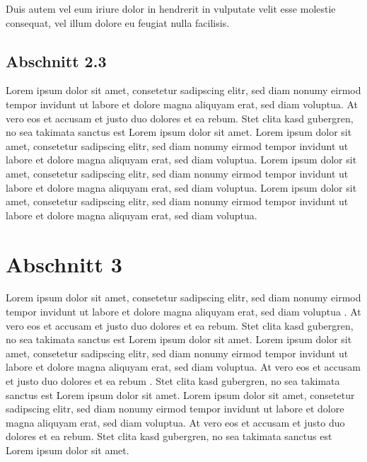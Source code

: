 Duis autem vel eum iriure dolor in hendrerit in vulputate velit esse molestie
consequat, vel illum dolore eu feugiat nulla facilisis.

\subsection{Abschnitt 2.3}
\label{ch:XYZ:sec:Abschnitt2:subsec:Abschnitt2-3}
Lorem ipsum dolor sit amet, consetetur sadipscing elitr, sed diam nonumy eirmod
tempor invidunt ut labore et dolore magna aliquyam erat, sed diam voluptua. At
vero eos et accusam et justo duo dolores et ea rebum. Stet clita
kasd gubergren, no sea takimata sanctus est Lorem ipsum dolor sit amet.
Lorem ipsum dolor sit amet, consetetur sadipscing elitr, sed diam nonumy eirmod
tempor invidunt ut labore et dolore magna aliquyam erat, sed diam voluptua.
Lorem ipsum dolor sit amet, consetetur sadipscing elitr, sed diam nonumy eirmod
tempor invidunt ut labore et dolore magna aliquyam erat, sed diam voluptua.
Lorem ipsum dolor sit amet, consetetur sadipscing elitr, sed diam nonumy eirmod
tempor invidunt ut labore et dolore magna aliquyam erat, sed diam voluptua.

\section{Abschnitt 3}
\label{ch:XYZ:sec:Abschnitt3}

Lorem ipsum dolor sit amet, consetetur sadipscing elitr, sed diam nonumy eirmod
tempor invidunt ut labore et dolore magna aliquyam erat, sed diam voluptua
\cite{ref3}. At vero eos et accusam et justo duo dolores et ea rebum. Stet clita
kasd gubergren, no sea takimata sanctus est Lorem ipsum dolor sit amet.
Lorem ipsum dolor sit amet, consetetur sadipscing elitr, sed diam nonumy eirmod
tempor invidunt ut labore et dolore magna aliquyam erat, sed diam voluptua. At
vero eos et accusam et justo duo dolores et ea rebum \cite{mcdysan}. Stet clita
kasd gubergren, no sea takimata sanctus est Lorem ipsum dolor sit amet. Lorem
ipsum dolor sit amet, consetetur sadipscing elitr, sed diam nonumy eirmod tempor
invidunt ut labore et dolore magna aliquyam erat, sed diam voluptua. At vero eos
et accusam et justo duo dolores et ea rebum. Stet clita kasd gubergren, no sea
takimata sanctus est Lorem ipsum dolor sit amet.


